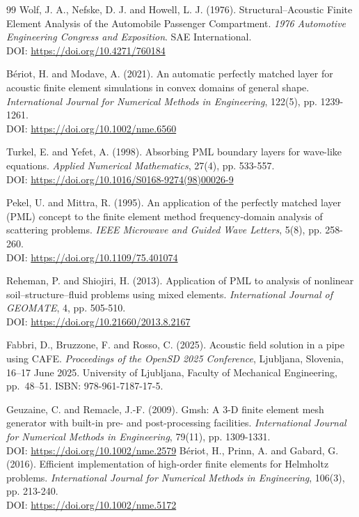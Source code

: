 \documentclass{jors}
\begin{document}
\begin{thebibliography}{99}
Wolf, J. A., Nefske, D. J. and Howell, L. J. (1976).  
Structural–Acoustic Finite Element Analysis of the Automobile Passenger Compartment.  
\textit{1976 Automotive Engineering Congress and Exposition}.  
SAE International.\\
DOI: \url{https://doi.org/10.4271/760184}

Bériot, H. and Modave, A. (2021).  
An automatic perfectly matched layer for acoustic finite element simulations in convex domains of general shape.  
\textit{International Journal for Numerical Methods in Engineering}, 122(5), pp. 1239-1261.\\
DOI: \url{https://doi.org/10.1002/nme.6560}

Turkel, E. and Yefet, A. (1998).  
Absorbing PML boundary layers for wave-like equations.  
\textit{Applied Numerical Mathematics}, 27(4), pp. 533-557.\\
DOI: \url{https://doi.org/10.1016/S0168-9274(98)00026-9}

Pekel, U. and Mittra, R. (1995).  
An application of the perfectly matched layer (PML) concept to the finite element method frequency-domain analysis of scattering problems.  
\textit{IEEE Microwave and Guided Wave Letters}, 5(8), pp. 258-260.\\
DOI: \url{https://doi.org/10.1109/75.401074}

Reheman, P. and Shiojiri, H. (2013).  
Application of PML to analysis of nonlinear soil–structure–fluid problems using mixed elements.  
\textit{International Journal of GEOMATE}, 4, pp. 505-510.\\
DOI: \url{https://doi.org/10.21660/2013.8.2167}

Fabbri, D., Bruzzone, F. and Rosso, C. (2025).  
Acoustic field solution in a pipe using CAFE.  
\textit{Proceedings of the OpenSD 2025 Conference}, Ljubljana, Slovenia, 16--17 June 2025.  
University of Ljubljana, Faculty of Mechanical Engineering, pp.~48--51.  
ISBN: 978-961-7187-17-5.

Geuzaine, C. and Remacle, J.-F. (2009).
Gmsh: A 3-D finite element mesh generator with built-in pre- and post-processing facilities.
\textit{International Journal for Numerical Methods in Engineering}, 79(11), pp. 1309-1331.\\
DOI: \url{https://doi.org/10.1002/nme.2579}
Bériot, H., Prinn, A. and Gabard, G. (2016).  
Efficient implementation of high-order finite elements for Helmholtz problems.  
\textit{International Journal for Numerical Methods in Engineering}, 106(3), pp. 213-240.\\
DOI: \url{https://doi.org/10.1002/nme.5172}


\end{thebibliography}
\end{document}

